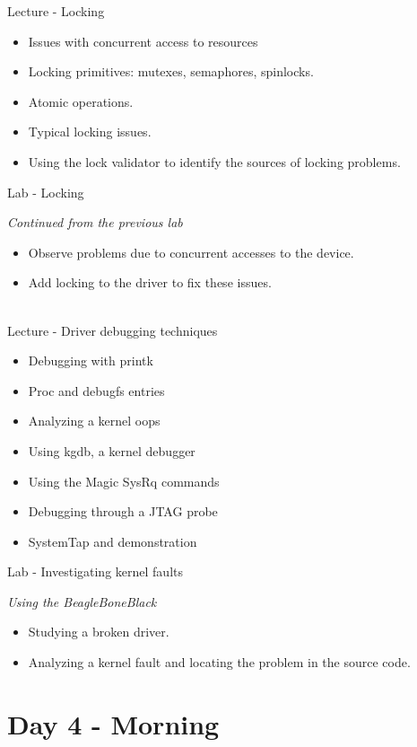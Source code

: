 \documentclass[a4paper,12pt,obeyspaces,spaces,hyphens]{article}
\begin{document}
\feagendatwocolumn
{Lecture - Locking}
{
  \begin{itemize}
  \item Issues with concurrent access to resources
  \item Locking primitives: mutexes, semaphores, spinlocks.
  \item Atomic operations.
  \item Typical locking issues.
  \item Using the lock validator to identify the sources of locking
    problems.
  \end{itemize}
}
{Lab - Locking}
{
  {\em Continued from the previous lab}
  \begin{itemize}
  \item Observe problems due to concurrent accesses to the device.
  \item Add locking to the driver to fix these issues.
  \end{itemize}
}
\\
\feagendatwocolumn
{Lecture - Driver debugging techniques}
{
  \begin{itemize}
  \item Debugging with printk
  \item Proc and debugfs entries
  \item Analyzing a kernel oops
  \item Using kgdb, a kernel debugger
  \item Using the Magic SysRq commands
  \item Debugging through a JTAG probe
  \item SystemTap and demonstration
  \end{itemize}
}
{Lab - Investigating kernel faults}
{
 {\em Using the BeagleBoneBlack}
  \begin{itemize}
  \item Studying a broken driver.
  \item Analyzing a kernel fault and locating the problem in the
    source code.
  \end{itemize}
}
\section{Day 4 - Morning}
\end{document}
